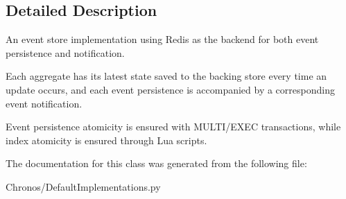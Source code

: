 \subsection{Detailed Description}
An event store implementation using Redis as the backend for both event persistence and notification. 

Each aggregate has its latest state saved to the backing store every time an update occurs, and each event persistence is accompanied by a corresponding event notification.

Event persistence atomicity is ensured with M\+U\+L\+T\+I/\+E\+X\+EC transactions, while index atomicity is ensured through Lua scripts. 

The documentation for this class was generated from the following file\+:\begin{DoxyCompactItemize}
\item 
Chronos/Default\+Implementations.\+py\end{DoxyCompactItemize}
